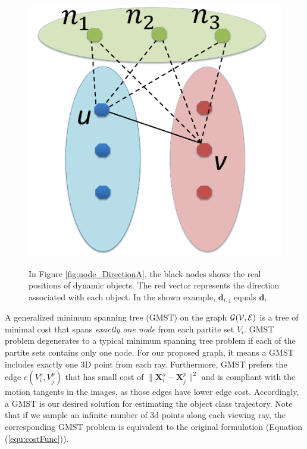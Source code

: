 \begin{figure}[t]
{    \includegraphics[height=0.19\textheight]{chapter4/resource/edgeReduction_cropped.pdf}
    \label{fig:node_edgeRemove}
}

\caption[Illustration of the motion tangent.]{In Figure \ref{fig:node_DirectionA}, the black nodes shows the real positions of dynamic objects. The red vector represents the direction associated with each object. In the shown example, $\mathbf{d}_{i,j}$ equals $\mathbf{d}_{i}$.  }
\label{fig:nodeDirection}
\end{figure}

A generalized minimum spanning tree (GMST) on the graph $\cal{G}(V,E)$ is a tree of minimal cost that spans \emph{exactly one node} from each partite set $V_i$. GMST problem degenerates to a typical minimum spanning tree problem \cite{Cormen:2001:IA:580470} if each of the partite sets contains only one node.
For our proposed graph, it means a GMST includes exactly one 3D point from each ray. Furthermore, GMST prefers the edge $e(V_i^o,V_j^p)$ that has small cost of $\|\mathbf{X}_i^o-\mathbf{X}_j^p\|^2$ and is compliant with the motion tangents in the images, as those edges have lower edge cost. Accordingly, a GMST is our desired solution for estimating the object class trajectory. Note that if we sample an infinite number of 3d points along each viewing ray, the corresponding GMST problem is equivalent to the original formulation (Equation (\ref{equ:costFunc})).%

